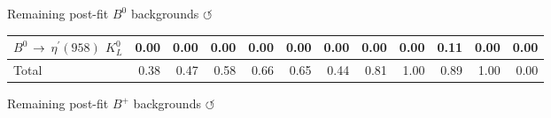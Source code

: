 \documentclass[xcolor=dvipsnames]{beamer}
\begin{document}
\begin{frame}{Remaining post-fit $B^0$ backgrounds \hyperlink{frame:A}{$\circlearrowleft$}}
{{\begin{tabular}{lrrrrrrrrrrr}
      $B^{0}$ $\rightarrow$ $\eta^{\prime}(958)$ $K_{L}^{0}$          &         0.00 &         0.00 &         0.00 &         0.00 &         0.00 &         0.00 &         0.00 &         0.00 &         0.11 &         0.00 &         0.00 \\
      \hline
      Total                                                   &         0.38 &         0.47 &         0.58 &         0.66 &         0.65 &         0.44 &         0.81 &         1.00 &         0.89 &         1.00 &         0.00 \\
      \hline
      \end{tabular}
      }}
      
   \end{frame}
\begin{frame}{Remaining post-fit $B^+$ backgrounds \hyperlink{frame:A}{$\circlearrowleft$}}
   

\end{frame}
\end{document}
